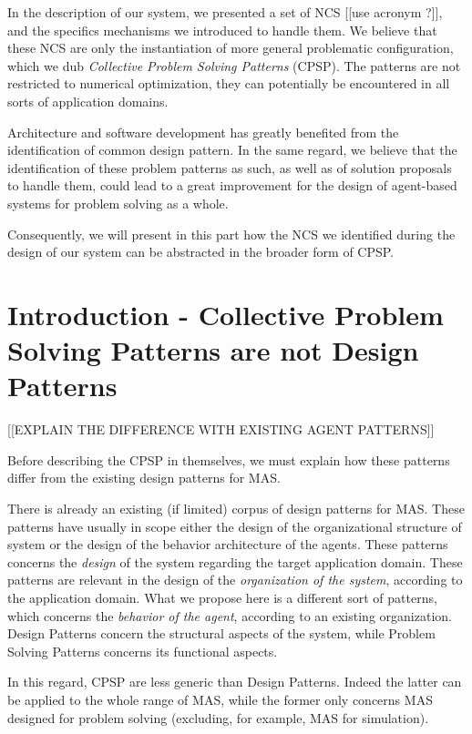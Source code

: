 In the description of our system, we presented a set of NCS [[use acronym ?]], and the specifics mechanisms we introduced to handle them. We believe that these NCS are only the instantiation of more general problematic configuration, which we dub \emph{Collective Problem Solving Patterns} (CPSP). The patterns are not restricted to numerical optimization, they can potentially be encountered in all sorts of application domains.

Architecture and software development has greatly benefited from the identification of common design pattern. In the same regard, we believe that the identification of these problem patterns as such, as well as of solution proposals to handle them, could lead to a great improvement for the design of agent-based systems for problem solving as a whole.

Consequently, we will present in this part how the NCS we identified during the design of our system can be abstracted in the broader form of CPSP.


\section{Introduction - Collective Problem Solving Patterns are not Design Patterns}

[[EXPLAIN THE DIFFERENCE WITH EXISTING AGENT PATTERNS]]

Before describing the CPSP in themselves, we must explain how these patterns differ from the existing design patterns for MAS.

There is already an existing (if limited) corpus of design patterns for MAS. These patterns have usually in scope either the design of the organizational structure of system or the design of the behavior architecture of the agents. These patterns concerns the \emph{design} of the system regarding the target application domain. These patterns are relevant in the design of the \emph{organization of the system}, according to the application domain.
What we propose here is a different sort of patterns, which concerns the \emph{behavior of the agent}, according to an existing organization. Design Patterns concern the structural aspects of the system, while Problem Solving Patterns concerns its functional aspects.

In this regard, CPSP are less generic than Design Patterns. Indeed the latter can be applied to the whole range of MAS, while the former only concerns MAS designed for problem solving (excluding, for example, MAS for simulation).

